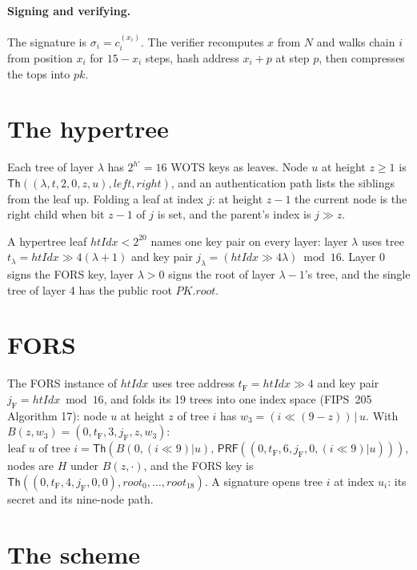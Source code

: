 \documentclass[11pt]{article}
\newcommand{\Th}{\mathsf{Th}}
\newcommand{\PRF}{\mathsf{PRF}}
\newcommand{\pkroot}{\mathit{PK.root}}
\newcommand{\htidx}{\mathit{htIdx}}
\begin{document}
\paragraph{Signing and verifying.}
The signature is $\sigma_i=c_i^{(x_i)}$. The verifier recomputes $x$ from $N$ and
walks chain $i$ from position $x_i$ for $15-x_i$ steps, hash address $x_i+p$ at step
$p$, then compresses the tops into $\mathit{pk}$.

\section{The hypertree}
\label{sec:tree}

Each tree of layer $\lambda$ has $2^{h'}=16$ WOTS keys as leaves. Node $u$ at height
$z\geq1$ is $\Th((\lambda,t,2,0,z,u),\mathit{left},\mathit{right})$, and an
authentication path lists the siblings from the leaf up. Folding a leaf at index $j$:
at height $z-1$ the current node is the right child when bit $z-1$ of $j$ is set,
and the parent's index is $j\gg z$.

A hypertree leaf $\htidx<2^{20}$ names one key pair on every layer: layer $\lambda$
uses tree $t_\lambda=\htidx\gg4(\lambda+1)$ and key pair
$j_\lambda=(\htidx\gg4\lambda)\bmod16$. Layer 0 signs the FORS key, layer $\lambda>0$
signs the root of layer $\lambda-1$'s tree, and the single tree of layer 4 has the
public root $\pkroot$.

\section{FORS}
\label{sec:fors}

The FORS instance of $\htidx$ uses tree address $t_{\mathrm F}=\htidx\gg4$ and key
pair $j_{\mathrm F}=\htidx\bmod16$, and folds its 19 trees into one index space (FIPS~205
Algorithm 17): node $u$ at height $z$ of tree $i$ has $w_3=(i\ll(9-z))\,|\,u$. With
$B(z,w_3)=(0,t_{\mathrm F},3,j_{\mathrm F},z,w_3)$:
\[
  \text{leaf }u\text{ of tree }i=\Th\!\left(B(0,(i\ll 9)|u),\,\PRF((0,t_{\mathrm F},6,j_{\mathrm F},0,(i\ll9)|u))\right),
\]
nodes are $H$ under $B(z,\cdot)$, and the FORS key is
$\Th((0,t_{\mathrm F},4,j_{\mathrm F},0,0),\mathit{root}_0,\dots,\mathit{root}_{18})$.
A signature opens tree $i$ at index $u_i$: its secret and its nine-node path.

\section{The scheme}
\label{sec:scheme}
\end{document}
